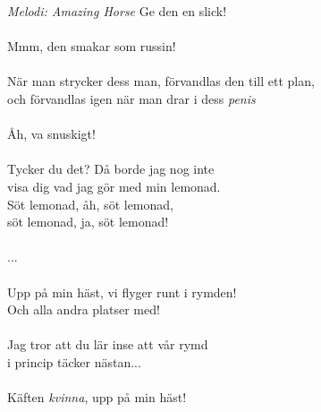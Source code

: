 {\footnotesize\textit{Melodi: Amazing Horse}}
\vspace{10pt}
Ge den en slick!\\
\\
Mmm, den smakar som russin!\\
\\
När man strycker dess man, förvandlas den till ett plan,\\
och förvandlas igen när man drar i dess {\it penis}\\
\\
Åh, va snuskigt!\\
\\
Tycker du det? Då borde jag nog inte\\
visa dig vad jag gör med min lemonad.\\
Söt lemonad, åh, söt lemonad,\\
söt lemonad, ja, söt lemonad!\\
\\
...\\
\\
Upp på min häst, vi flyger runt i rymden!\\
Och alla andra platser med!\\
\\
Jag tror att du lär inse att vår rymd\\
i princip täcker nästan...\\
\\
Käften {\it kvinna}, upp på min häst!
